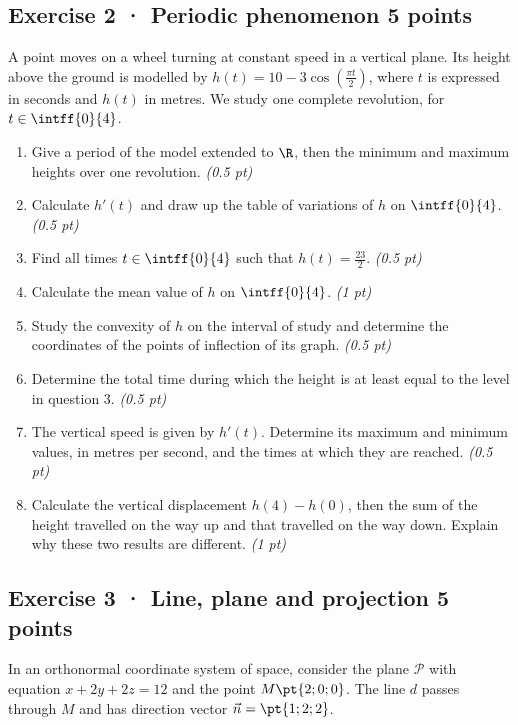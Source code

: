\subsection*{Exercise 2 · Periodic phenomenon \hfill 5 points}A point moves on a wheel turning at constant speed in a vertical plane. Its height above the ground is modelled by $h(t)=10-3\cos\left(\frac{\pi t}{2}\right)$, where $t$ is expressed in seconds and $h(t)$ in metres. We study one complete revolution, for $t\in\intff{0}{4}$.

\begin{enumerate}

\item Give a period of the model extended to $\R$, then the minimum and maximum heights over one revolution. \hfill\textit{(0.5 pt)}

\item Calculate $h'(t)$ and draw up the table of variations of $h$ on $\intff{0}{4}$. \hfill\textit{(0.5 pt)}

\item Find all times $t\in\intff{0}{4}$ such that $h(t)=\frac{23}{2}$. \hfill\textit{(0.5 pt)}

\item Calculate the mean value of $h$ on $\intff{0}{4}$. \hfill\textit{(1 pt)}

\item Study the convexity of $h$ on the interval of study and determine the coordinates of the points of inflection of its graph. \hfill\textit{(0.5 pt)}

\item Determine the total time during which the height is at least equal to the level in question 3. \hfill\textit{(0.5 pt)}

\item The vertical speed is given by $h'(t)$. Determine its maximum and minimum values, in metres per second, and the times at which they are reached. \hfill\textit{(0.5 pt)}

\item Calculate the vertical displacement $h(4)-h(0)$, then the sum of the height travelled on the way up and that travelled on the way down. Explain why these two results are different. \hfill\textit{(1 pt)}

\end{enumerate}

\mxnewpage{}

\subsection*{Exercise 3 · Line, plane and projection \hfill 5 points}In an orthonormal coordinate system of space, consider the plane $\mathcal P$ with equation $x+2y+2z=12$ and the point $M\pt{2;0;0}$. The line $d$ passes through $M$ and has direction vector $\vec n=\pt{1;2;2}$.

